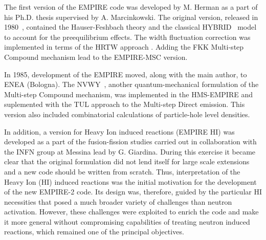 \documentclass[twocolumn,amsmath,amssymb,10pt,groupedaddress,a4paper]{revtex4}
\begin{document}
The first version of the EMPIRE code was developed by M. Herman as a part of his Ph.D. thesis supervised by A. Marcinkowski. The original version, released in 1980~\cite{EMPIRE-I},
contained the Hauser-Feshbach theory and the
classical HYBRID~\cite{hybrid, hybrid1, hybrid2, hybrid3} model to account for the preequilibrium
effects. The width fluctuation correction was implemented in terms
of the HRTW approach \cite{HRTW,HHM}. Adding the FKK Multi-step Compound
mechanism \cite{FKK} lead to the EMPIRE-MSC version.

In 1985, development of the EMPIRE moved, along with the main author, to ENEA (Bologna).
The NVWY~\cite{NVWY}, another quantum-mechanical formulation of the Multi-step Compound mechanism,
was implemented in the HMS-EMPIRE and suplemented with the TUL approach\cite{TUL} to the Multi-step Direct emission. This version also
included combinatorial calculations of particle-hole level densities.

In addition, a version for Heavy Ion induced reactions (EMPIRE HI)
was developed as a part of the fusion-fission studies carried out in collaboration with the INFN group at Messina lead by G. Giardina. During this exercise it became clear that the original formulation did not lend itself for large scale extensions and a new code should be written from scratch. Thus, interpretation of the Heavy Ion (HI) induced reactions was the initial motivation for the development of the new EMPIRE-2 code. Its design was, therefore,  guided by the particular HI necessities that posed a much broader variety of challenges than neutron activation. However, these challenges were exploited to enrich the code and make it more general without compromising capabilities of treating neutron induced reactions, which remained one of the principal objectives.
\end{document}
